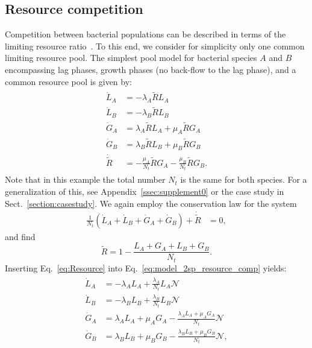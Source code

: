 \documentclass[10pt,1p,authoryear]{elsarticle}
\numberwithin{equation}{section}
\begin{document}
\subsection{Resource competition}
Competition between bacterial populations can be described in terms of the limiting resource ratio~\citep{tilman_resource_1977, smith_effects_2002,ghoul_ecology_2016}.
To this end, we consider for simplicity only one common limiting resource pool. The simplest pool model for bacterial species $A$ and $B$ encompassing lag phases, growth phases (no back-flow to the lag phase), and a common resource pool is given by:
\begin{align}
    \begin{split}
        \dot{L}_A &= - \lambda_A \tilde{R} L_A\\
        \dot{L}_B &= - \lambda_B \tilde{R} L_B \\
        \dot{G}_A &= \lambda_A \tilde{R} L_A +\mu_A \tilde{R} G_A\\
        \dot{G}_B &= \lambda_B \tilde{R} L_B +\mu_B \tilde{R} G_B\\
        \dot{\tilde{R}} &=-\frac{\mu_A}{N_t} \tilde{R} G_A-\frac{\mu_B}{N_t} \tilde{R} G_B.
    \end{split}
    \label{eq:model_2sp_resource_comp}
\end{align}
Note that in this example the total number $N_t$ is the same for both species. For a generalization of this, see Appendix~\ref{ssec:supplement0} or the case study in Sect.~\ref{section:casestudy}. We again employ the conservation law for the system
\begin{align}
        \frac{1}{N_t}(\dot{L}_A + \dot{L}_B + \dot{G}_A +\dot{G}_B) +\dot{\tilde{R}} &=0,
\end{align}
 and find
\begin{equation}
    \tilde{R} =1-\frac{L_A+G_A+L_B+G_B}{N_t}.
    \label{eq:Resource}
\end{equation}
Inserting Eq.~\eqref{eq:Resource} into Eq.~\eqref{eq:model_2sp_resource_comp} yields:
\begin{align}
\begin{split}
    \dot{L}_A &= -\lambda_A  L_A + \frac{\lambda_A}{N_t}L_A\mathcal{N}\\
    \dot{L}_B &= -\lambda_B L_B + \frac{\lambda_B}{N_t}L_B\mathcal{N}\\
    \dot{G}_A &=  \lambda_A  L_A + \mu_A G_A - \frac{\lambda_A L_A + \mu_A G_A}{N_t}\mathcal{N}\\
    \dot{G}_B &=  \lambda_B L_B + \mu_B G_B - \frac{\lambda_B L_B + \mu_B G_B}{N_t}\mathcal{N},
    \end{split}
\end{align}
\end{document}
